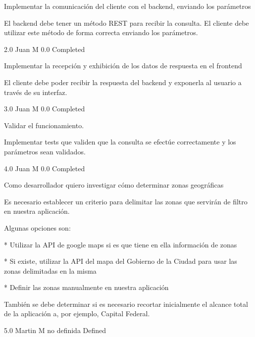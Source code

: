 		{Implementar la comunicación del cliente con el backend, enviando los parámetros} %
		{El backend debe tener un método REST para recibir la consulta. El cliente debe
utilizar este método de forma correcta enviando los parámetros.

} %
		{2.0} %
		{Juan M} %
		{0.0} %
		{Completed} %

		{Implementar la recepción y exhibición de los datos de respuesta en el frontend} %
		{El cliente debe poder recibir la respuesta del backend y exponerla al usuario
a través de su interfaz.

} %
		{3.0} %
		{Juan M} %
		{0.0} %
		{Completed} %

		{Validar el funcionamiento.} %
		{Implementar tests que validen que la consulta se efectúe correctamente y los
parámetros sean validados.

} %
		{4.0} %
		{Juan M} %
		{0.0} %
		{Completed} %


\vspace{20pt}

	{Como desarrollador quiero investigar cómo determinar zonas geográficas} %
	{Es necesario establecer un criterio para delimitar las zonas que servirán de
filtro en nuestra aplicación.

Algunas opciones son:

  

* Utilizar la API de google maps si es que tiene en ella información de zonas

* Si existe, utilizar la API del mapa del Gobierno de la Ciudad para usar las zonas delimitadas en la misma

* Definir las zonas manualmente en nuestra aplicación

  

También se debe determinar si es necesario recortar inicialmente el alcance
total de la aplicación a, por ejemplo, Capital Federal.

  

} %
	{} %
	{5.0} %
	{Martin M} %
	{no definida} %
	{Defined} %


